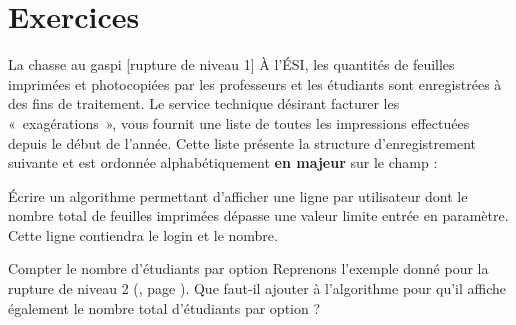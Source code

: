 \section{Exercices}


\begin{Exercice}{La chasse au gaspi [rupture de niveau 1]}
	À l’ÉSI, les quantités de feuilles imprimées et photocopiées 
	par les professeurs et les étudiants sont enregistrées à des fins de traitement.
	Le service technique désirant facturer les «~exagérations~», 
	vous fournit une liste de toutes les impressions effectuées depuis le début de l'année.
	Cette liste présente la structure d’enregistrement  suivante 
	et est ordonnée alphabétiquement \textbf{en majeur} sur le champ   :

	\begin{algo}
	\end{algo}

	Écrire un algorithme permettant d'afficher une ligne par
	utilisateur dont le nombre total de feuilles imprimées dépasse une
	valeur limite entrée en paramètre. 
	Cette ligne contiendra le login et le nombre.
\end{Exercice}
\begin{Solution}
  \begin{algo}
  \end{algo}
\end{Solution}


\begin{Exercice}{Compter le nombre d'étudiants par option}
	Reprenons l'exemple donné pour la rupture de niveau 2 (, page \pageref{algo:rupt2}).
	Que faut-il ajouter à l'algorithme pour qu'il affiche également 
	le nombre total d'étudiants par option ?
\end{Exercice}

